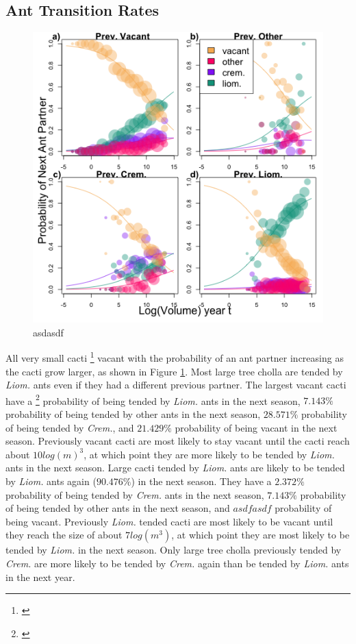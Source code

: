 \documentclass[12pt,a4paper]{article}
\newcommand{\tom}[2]{{\color{red}{#1}}\footnote{\textit{\color{red}{#2}}}}
\begin{document}
		\subsection*{Ant Transition Rates}
			\begin{figure}[h]
			\includegraphics[width=0.58\linewidth]{Ant_Size_Multi.png}
			\caption{asdasdf}
			\label{fig:ant}
		\end{figure}
		All very small cacti \tom{are}{your tense is inconsistent} vacant with the probability of an ant partner increasing as the cacti grow larger, as shown in Figure \ref{fig:ant}. 
		Most large tree cholla are tended by \textit{Liom.} ants even if they had a different previous partner.
		The largest vacant cacti have a \tom{$42.875\%$}{we should talk about this but I don't think these point values are very effectivein the text} probability of being tended by \textit{Liom.} ants in the next season, $7.143\%$ probability of being tended by other ants in the next season, $28.571\%$ probability of being tended by \textit{Crem.}, and $21.429\%$ probability of being vacant in the next season.
		Previously vacant cacti are most likely to stay vacant until the cacti reach about $10 log(m)^3$, at which point they are more likely to be tended by \textit{Liom.} ants in the next season. 
		Large cacti tended by \textit{Liom.} ants are likely to be tended by \textit{Liom.} ants again ($90.476\%$) in the next season.
		They have a $2.372\%$ probability of being tended by \textit{Crem.} ants in the next season, $7.143\%$ probability of being tended by other ants in the next season, and $asdfasdf$ probability of being vacant.  
		Previously \textit{Liom.} tended cacti are most likely to be vacant until they reach the size of about $7 log(m^3)$, at which point they are most likely to be tended by \textit{Liom.} in the next season.
		Only large tree cholla previously tended by \textit{Crem.} are more likely to be tended by \textit{Crem.} again than be tended by \textit{Liom.} ants in the next year. 
\end{document}
